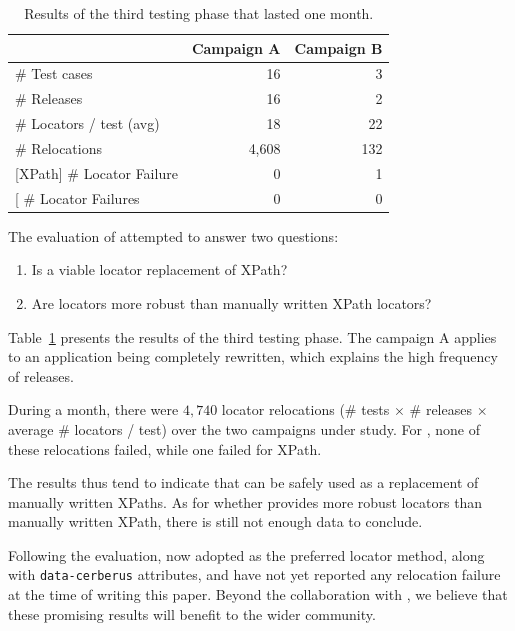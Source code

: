 \documentclass[10pt,conference]{IEEEtran}
\begin{document}
\begin{table}[]
\centering
\begin{tabular}{l|r|r|}
\cline{2-3}
                                                       & \bf Campaign A & \bf Campaign B \\ \hline
\multicolumn{1}{|l|}{\# Test cases}                        & 16         & 3          \\ \hline
\multicolumn{1}{|l|}{\# Releases}                          & 16         & 2          \\ \hline
\multicolumn{1}{|l|}{\# Locators / test (avg)}             & 18         & 22          \\ \hline
\multicolumn{1}{|l|}{\# Relocations}                       & 4,608       & 132         \\ \hline
\multicolumn{1}{|l|}{{[}XPath{]} \# Locator Failure} & 0          & 1          \\ \hline
\multicolumn{1}{|l|}{{[}\erratum{}{]} \# Locator Failures} & 0          & 0          \\ \hline
\end{tabular}
\caption{Results of the third testing phase that lasted one month.}
\label{table:results}
\end{table}

The evaluation of \erratum attempted to answer two questions:
\begin{enumerate}
\item Is \erratum a viable locator replacement of XPath?
\item Are \erratum locators more robust than manually written XPath locators?
\end{enumerate}

Table~\ref{table:results} presents the results of the third testing phase.
The campaign A applies to an application being completely rewritten, which explains the high frequency of releases.

During a month, there were $4,740$ locator relocations (\# tests $\times$ \# releases $\times$ average \# locators / test) over the two campaigns under study.
For \erratum, none of these relocations failed, while one failed for XPath.

The results thus tend to indicate that \erratum can be safely used as a replacement of manually written {\sc XPaths}.
As for whether \erratum provides more robust locators than manually written XPath, there is still not enough data to conclude. 

Following the evaluation, \laredoute{} now adopted \erratum as the preferred locator method, along with \texttt{data-cerberus} attributes, and have not yet reported any relocation failure at the time of writing this paper.
Beyond the collaboration with \laredoute, we believe that these promising results will benefit to the wider \cerberus community.
\end{document}
